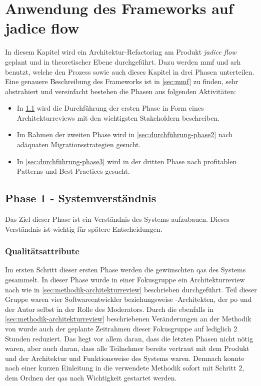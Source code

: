 \chapter{Anwendung des Frameworks auf jadice flow}
\label{chap:anwendung}

In diesem Kapitel wird ein Architektur-Refactoring am Produkt \emph{jadice flow} geplant und in theoretischer Ebene durchgeführt.
Dazu werden \acrfull{mmf} und \acrfull{arh} benutzt, welche den Prozess sowie auch dieses Kapitel in drei Phasen unterteilen.
Eine genauere Beschreibung des Frameworks ist in \cref{sec:mmf} zu finden, sehr abstrahiert und vereinfacht bestehen die Phasen aus folgenden Aktivitäten:
\begin{itemize}
	\item In \cref{sec:durchführung-phase1} wird die Durchführung der ersten Phase in Form eines Architekturreviews mit den wichtigsten Stakeholdern beschreiben.
	\item Im Rahmen der zweiten Phase wird in \cref{sec:durchführung-phase2} nach adäquaten Migrationsstrategien gesucht.
	\item In \cref{sec:durchführung-phase3} wird in der dritten Phase nach profitablen Patterns und Best Practices gesucht.
\end{itemize}

\section{Phase 1 - Systemverständnis}
\label{sec:durchführung-phase1}

Das Ziel dieser Phase ist ein Verständnis des Systems aufzubauen.
Dieses Verständnis ist wichtig für spätere Entscheidungen.

\subsection{Qualitätsattribute}

Im ersten Schritt dieser ersten Phase werden die gewünschten \glspl{qa} des Systems gesammelt.
In dieser Phase wurde in einer Fokusgruppe ein Architekturreview nach  wie in \cref{sec:methodik-architekturreview} beschrieben durchgeführt.
Teil dieser Gruppe waren vier Softwareentwickler beziehungsweise -Architekten, der \acrlong{po} und der Autor selbst in der Rolle des Moderators.
Durch die ebenfalls in \cref{sec:methodik-architekturreview} beschriebenen Veränderungen an der Methodik von  wurde auch der geplante Zeitrahmen dieser Fokusgruppe auf lediglich 2 Stunden reduziert. Das liegt vor allem daran, dass die letzten Phasen nicht nötig waren, aber auch daran, dass alle Teilnehmer bereits vertraut mit dem Produkt und der Architektur und Funktionsweise des Systems waren.
Demnach konnte nach einer kurzen Einleitung in die verwendete Methodik sofort mit Schritt 2, dem Ordnen der \glspl{qa} nach Wichtigkeit gestartet werden.

